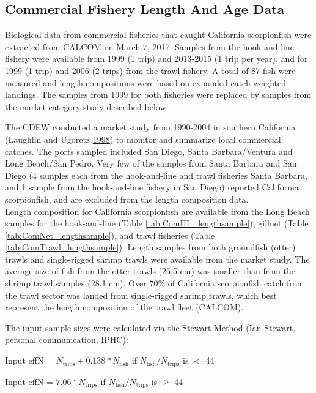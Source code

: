 \documentclass[12pt,]{article}
\begin{document}
\subsection{Commercial Fishery Length And Age
Data}\label{commercial-fishery-length-and-age-data}

Biological data from commercial fisheries that caught California
scorpionfish were extracted from CALCOM on March 7, 2017. Samples from
the hook and line fishery were available from 1999 (1 trip) and
2013-2015 (1 trip per year), and for 1999 (1 trip) and 2006 (2 trips)
from the trawl fishery. A total of 87 fish were measured and length
compositions were based on expanded catch-weighted landings. The samples
from 1999 for both fisheries were replaced by samples from the market
category study described below.

The CDFW conducted a market study from 1990-2004 in southern California
(Laughlin and Ugoretz \protect\hyperlink{ref-Laughlin1998}{1998}) to
monitor and summarize local commercial catches. The ports sampled
included San Diego, Santa Barbara/Ventura and Long Beach/San Pedro. Very
few of the samples from Santa Barbara and San Diego (4 samples each from
the hook-and-line and trawl fisheries Santa Barbara, and 1 sample from
the hook-and-line fishery in San Diego) reported California
scorpionfish, and are excluded from the length composition data.\\
Length composition for California scorpionfish are available from the
Long Beach samples for the hook-and-line (Table
\ref{tab:ComHL_lengthsample}), gillnet (Table
\ref{tab:ComNet_lengthsample}), and trawl fisheries (Table
\ref{tab:ComTrawl_lengthsample}). Length samples from both groundfish
(otter) trawls and single-rigged shrimp trawls were available from the
market study. The average size of fish from the otter trawls (26.5 cm)
was smaller than from the shrimp trawl samples (28.1 cm). Over 70\% of
California scorpionfish catch from the trawl sector was landed from
single-rigged shrimp trawls, which best represent the length composition
of the trawl fleet (CALCOM).

The input sample sizes were calculated via the Stewart Method (Ian
Stewart, personal communication, IPHC):

\begin{centering}

Input effN = $N_{\text{trips}} + 0.138 * N_{\text{fish}}$ if $N_{\text{fish}}/N_{\text{trips}}$ is $<$ 44

Input effN = $7.06 * N_{\text{trips}}$ if $N_{\text{fish}}/N_{\text{trips}}$ is $\geq$ 44

\end{centering}
\end{document}
